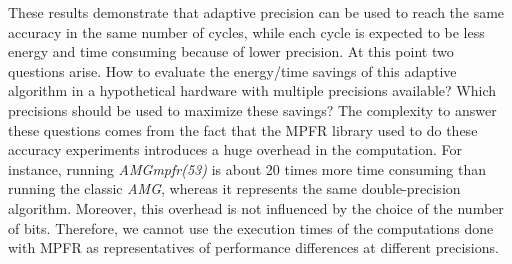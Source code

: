 These results demonstrate that adaptive precision can be used to reach the
same accuracy in the same number of cycles, while each cycle is expected to be
less energy and time consuming because of lower precision. At this point two
questions arise. How to evaluate the energy/time savings of this adaptive
algorithm in a hypothetical hardware with multiple precisions available? Which
precisions should be used to maximize these savings? The complexity to answer
these questions comes from the fact that the MPFR library used to do these
accuracy experiments introduces a huge overhead in the computation. For
instance, running \emph{AMGmpfr(53)} is about 20 times more time consuming than
running the classic \emph{AMG}, whereas it represents the same double-precision
algorithm.  Moreover, this overhead is not influenced by the choice of the
number of bits. Therefore, we cannot use the execution times of the
computations done with MPFR as representatives of performance differences at
different precisions.



